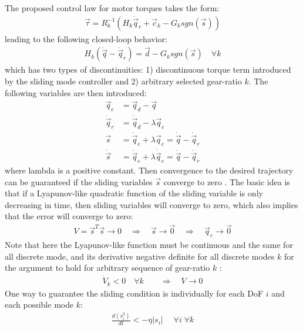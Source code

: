 The proposed control law for motor torques takes the form:
%
\begin{align}
\vec{\tau} = R_k^{-1} \left( H_k \ddot{\vec{q}}_r + \vec{c}_k - G_k sgn( \vec{s} ) \right) 
\label{eq:slidinglaw}
\end{align}
%
leading to the following closed-loop behavior:
%
\begin{align}
H_k ( \ddot{\vec{q}} - \ddot{\vec{q}}_r ) = \vec{d} - G_k sgn( \vec{s} ) \quad \forall k
\label{eq:slidinglawcl}
\end{align}
%
which has two types of discontinuities: 1) discontinuous torque term introduced by the sliding mode controller and 2) arbitrary selected gear-ratio $k$.
%
The following variables are then introduced:
%
\begin{align}
\vec{q}_e       &= \vec{q}_d       - \vec{q} \\
\dot{\vec{q}}_r &= \dot{\vec{q}}_d - \lambda  \vec{q}_e \\
\vec{s}         &= \dot{\vec{q}}_e + \lambda  \vec{q}_e  = \dot{\vec{q}} - \dot{\vec{q}}_r \\
\dot{\vec{s}}   &= \ddot{\vec{q}}_e + \lambda  \dot{\vec{q}}_e  = \ddot{\vec{q}} - \ddot{\vec{q}}_r
\end{align}
%
where lambda is a positive constant. Then convergence to the desired trajectory can be guaranteed if the sliding variables $\vec{s}$ converge to zero \cite{slotine_applied_1991}. The basic idea is that if a Lyapunov-like quadratic function of the sliding variable is only decreasing in time, then sliding variables will converge to zero, which also implies that the error will converge to zero:
%
\begin{align}
V = \vec{s}^T \vec{s} \rightarrow 0 \quad\Rightarrow\quad  \vec{s} \rightarrow \vec{0} \quad\Rightarrow\quad \vec{q}_e \rightarrow \vec{0}
\end{align}
%
Note that here the Lyapunov-like function must be continuous and the same for all discrete mode, and its derivative negative definite for all discrete modes $k$ for the argument to hold for arbitrary sequence of gear-ratio $k$ \cite{liberzon_switching_2003}:
%
\begin{align}
\dot{V}_k < 0 \quad \forall k \quad \quad\Rightarrow\quad V \rightarrow 0
\end{align}
%
One way to guarantee the sliding condition is individually for each DoF $i$ and each possible mode $k$:
%
\begin{align}
\frac{d( s_i^2 )}{dt} < -\eta |s_i| \; \quad \forall i \; \forall k
\label{eq:slidingcondition}
\end{align}
